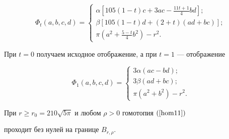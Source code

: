\begin{equation}\label{hom11}


\Phi_t(a,b,c,d)=


\begin{cases}


\alpha [105(1-t)c+3ac-\frac{11t+1}{4}bd];\\


\beta [105(1-t)d+(2+t)(ad+bc)];\\


\pi (a^2+\frac{5-t}{4}b^2)-r^2.


\end{cases}


\end{equation}


При $t=0$ получаем исходное отображение, а при $t=1$ --- отображение


$$


\Phi_1(a,b,c,d)=


\begin{cases}


3\alpha (ac-bd);\\


3\beta (ad+bc);\\


\pi(a^2+b^2)-r^2.


\end{cases}


$$





\begin{lem}\label{hom}


При $r\ge r_0=210\sqrt{5\pi}$ и любом $\rho >0$ гомотопия $(\ref{hom11})$


проходит без нулей на границе $B_{r,\rho }$.


\end{lem}





